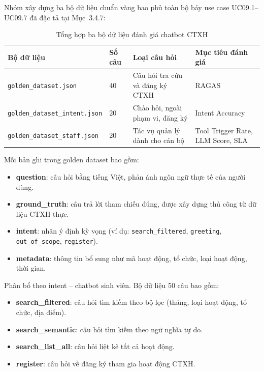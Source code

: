 Nhóm xây dựng ba bộ dữ liệu chuẩn vàng bao phủ toàn bộ bảy use case UC09.1--UC09.7 đã đặc tả tại Mục~3.4.7:

\begin{table}[H]
\centering
\renewcommand{\arraystretch}{1.3}
\small
\begin{tabular}{|p{4.5cm}|p{1.5cm}|p{4.5cm}|p{4.0cm}|}
\hline
\textbf{Bộ dữ liệu} & \textbf{Số câu} & \textbf{Loại câu hỏi} & \textbf{Mục tiêu đánh giá} \\
\hline
\texttt{golden\_dataset.json} & 40 & Câu hỏi tra cứu và đăng ký CTXH & RAGAS \\
\hline
\texttt{golden\_dataset\_intent.json} & 20 & Chào hỏi, ngoài phạm vi, đăng ký & Intent Accuracy \\
\hline
\texttt{golden\_dataset\_staff.json} & 20 & Tác vụ quản lý dành cho cán bộ & Tool Trigger Rate, LLM Score, SLA \\
\hline
\end{tabular}
\caption{Tổng hợp ba bộ dữ liệu đánh giá chatbot CTXH}
\end{table}

Mỗi bản ghi trong golden dataset bao gồm:
\begin{itemize}
    \item \textbf{question}: câu hỏi bằng tiếng Việt, phản ánh ngôn ngữ thực tế của người dùng.
    \item \textbf{ground\_truth}: câu trả lời tham chiếu đúng, được xây dựng thủ công từ dữ liệu CTXH thực.
    \item \textbf{intent}: nhãn ý định kỳ vọng (ví dụ: \texttt{search\_filtered}, \texttt{greeting}, \texttt{out\_of\_scope}, \texttt{register}).
    \item \textbf{metadata}: thông tin bổ sung như mã hoạt động, tổ chức, loại hoạt động, thời gian.
\end{itemize}

Phân bổ theo intent -- chatbot sinh viên. Bộ dữ liệu 50 câu bao gồm:
\begin{itemize}
    \item \textbf{search\_filtered}: câu hỏi tìm kiếm theo bộ lọc (tháng, loại hoạt động, tổ chức, địa điểm).
    \item \textbf{search\_semantic}: câu hỏi tìm kiếm theo ngữ nghĩa tự do.
    \item \textbf{search\_list\_all}: câu hỏi liệt kê tất cả hoạt động.
    \item \textbf{register}: câu hỏi về đăng ký tham gia hoạt động CTXH.
\end{itemize}

